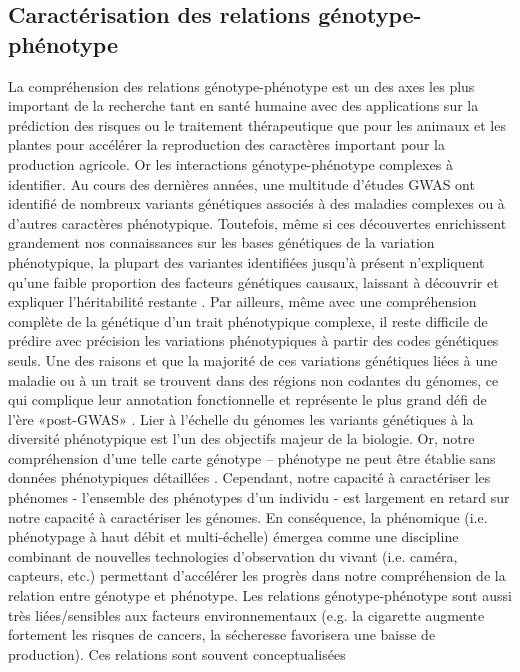 \subsection{Caractérisation des relations génotype-phénotype}
 La compréhension des relations génotype-phénotype est un des axes les plus important de la recherche tant en santé humaine avec des applications sur la prédiction des risques ou le traitement thérapeutique que pour les animaux et les plantes pour accélérer la reproduction des caractères important pour la production agricole. Or les interactions génotype-phénotype complexes à identifier. Au cours des dernières années, une multitude d'études GWAS ont identifié de nombreux variants génétiques associés à des maladies complexes ou à d'autres caractères phénotypique. Toutefois, même si ces découvertes enrichissent grandement nos connaissances sur les bases génétiques de la variation phénotypique, la plupart des variantes identifiées jusqu’à présent n’expliquent qu'une faible proportion des facteurs génétiques causaux, laissant à découvrir et expliquer l'héritabilité restante \cite{manolio2009}. Par ailleurs, même avec une compréhension complète de la génétique d'un trait phénotypique complexe, il reste difficile de prédire avec précision les variations phénotypiques à partir des codes génétiques seuls. Une des raisons et que la majorité de ces variations génétiques liées à une maladie ou à un trait se trouvent dans des régions non codantes du génomes, ce qui complique leur annotation fonctionnelle et représente le plus grand défi de l’ère «post-GWAS» \cite{freedman2011,Hou2013a}.
 Lier à l'échelle du génomes les variants génétiques à la diversité phénotypique est l’un des objectifs majeur de la biologie. Or, notre compréhension d'une telle carte génotype – phénotype ne peut être établie sans données phénotypiques détaillées \cite{houle2010}. Cependant, notre capacité à caractériser les phénomes - l'ensemble des phénotypes d'un individu - est largement en retard sur notre capacité à caractériser les génomes. En conséquence, la phénomique (i.e. phénotypage à haut débit et multi-échelle) émergea comme une discipline combinant de nouvelles technologies d'observation du vivant (i.e. caméra, capteurs, etc.) permettant d’accélérer les progrès dans notre compréhension de la relation entre génotype et phénotype.
 Les relations génotype-phénotype sont aussi très liées/sensibles aux facteurs environnementaux (e.g. la cigarette augmente fortement les risques de cancers, la sécheresse favorisera une baisse de production). Ces relations sont souvent conceptualisées \\ 

